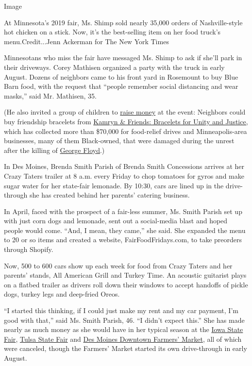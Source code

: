 Image

At Minnesota's 2019 fair, Ms. Shimp sold nearly 35,000 orders of
Nashville-style hot chicken on a stick. Now, it's the best-selling item
on her food truck's menu.Credit...Jenn Ackerman for The New York Times

Minnesotans who miss the fair have messaged Ms. Shimp to ask if she'll
park in their driveways. Corey Mathisen organized a party with the truck
in early August. Dozens of neighbors came to his front yard in Rosemount
to buy Blue Barn food, with the request that ``people remember social
distancing and wear masks,'' said Mr. Mathisen, 35.

(He also invited a group of children to
\href{https://www.gofundme.com/f/kamryn-amp-friends-bracelets-for-unity-amp-justice}{raise
money} at the event: Neighbors could buy friendship bracelets from
\href{https://www.cnn.com/2020/06/20/us/kamryn-friends-sell-bracelets-businesses-minneapolis-trnd/index.html}{Kamryn
\& Friends: Bracelets for Unity and Justice,} which has collected more
than \$70,000 for food-relief drives and Minneapolis-area businesses,
many of them Black-owned, that were damaged during the unrest after the
killing of
\href{https://www.nytimes3xbfgragh.onion/news-event/george-floyd-protests-minneapolis-new-york-los-angeles}{George
Floyd}.)

In Des Moines, Brenda Smith Parish of Brenda Smith Concessions arrives
at her Crazy Taters trailer at 8 a.m. every Friday to chop tomatoes for
gyros and make sugar water for her state-fair lemonade. By 10:30, cars
are lined up in the drive-through she has created behind her parents'
catering business.

In April, faced with the prospect of a fair-less summer, Ms. Smith
Parish set up with just corn dogs and lemonade, sent out a social-media
blast and hoped people would come. ``And, I mean, they came,'' she said.
She expanded the menu to 20 or so items and created a website,
FairFoodFridays.com, to take preorders through Shopify.

Now, 500 to 600 cars show up each week for food from Crazy Taters and
her parents' stands, All American Grill and Turkey Time. An acoustic
guitarist plays on a flatbed trailer as drivers roll down their windows
to accept handoffs of pickle dogs, turkey legs and deep-fried Oreos.

``I started this thinking, if I could just make my rent and my car
payment, I'm good with that,'' said Ms. Smith Parish, 46. ``I didn't
expect this.'' She has made nearly as much money as she would have in
her typical season at the \href{https://www.iowastatefair.org/}{Iowa
State Fair}, \href{https://www.tulsastatefair.com/}{Tulsa State Fair}
and \href{https://www.dsmpartnership.com/desmoinesfarmersmarket/}{Des
Moines Downtown Farmers' Market}, all of which were canceled, though the
Farmers' Market started its own drive-through in early August.

